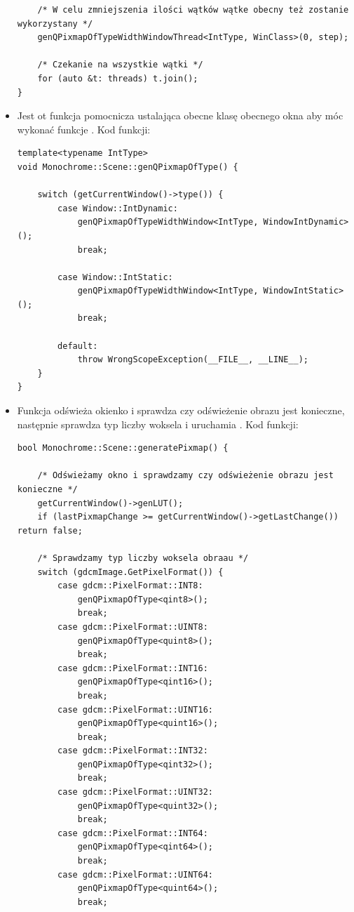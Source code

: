 \begin{itemize}
\begin{lstlisting}
    /* W celu zmniejszenia ilości wątków wątke obecny też zostanie wykorzystany */
    genQPixmapOfTypeWidthWindowThread<IntType, WinClass>(0, step);

    /* Czekanie na wszystkie wątki */
    for (auto &t: threads) t.join();
}
\end{lstlisting}

    \item {}

          Jest ot funkcja pomocnicza ustalająca obecne klasę obecnego okna aby móc wykonać funkcje .
          Kod funkcji:
          \begin{lstlisting}
template<typename IntType>
void Monochrome::Scene::genQPixmapOfType() {

    switch (getCurrentWindow()->type()) {
        case Window::IntDynamic:
            genQPixmapOfTypeWidthWindow<IntType, WindowIntDynamic>();
            break;

        case Window::IntStatic:
            genQPixmapOfTypeWidthWindow<IntType, WindowIntStatic>();
            break;

        default:
            throw WrongScopeException(__FILE__, __LINE__);
    }
}
\end{lstlisting}

    \item {}

          Funkcja odświeża okienko i sprawdza czy odświeżenie obrazu jest konieczne, następnie sprawdza typ liczby woksela i uruchamia .
          Kod funkcji:
          \begin{lstlisting}
bool Monochrome::Scene::generatePixmap() {

    /* Odświeżamy okno i sprawdzamy czy odświeżenie obrazu jest konieczne */
    getCurrentWindow()->genLUT();
    if (lastPixmapChange >= getCurrentWindow()->getLastChange()) return false;

    /* Sprawdzamy typ liczby woksela obraau */
    switch (gdcmImage.GetPixelFormat()) {
        case gdcm::PixelFormat::INT8:
            genQPixmapOfType<qint8>();
            break;
        case gdcm::PixelFormat::UINT8:
            genQPixmapOfType<quint8>();
            break;
        case gdcm::PixelFormat::INT16:
            genQPixmapOfType<qint16>();
            break;
        case gdcm::PixelFormat::UINT16:
            genQPixmapOfType<quint16>();
            break;
        case gdcm::PixelFormat::INT32:
            genQPixmapOfType<qint32>();
            break;
        case gdcm::PixelFormat::UINT32:
            genQPixmapOfType<quint32>();
            break;
        case gdcm::PixelFormat::INT64:
            genQPixmapOfType<qint64>();
            break;
        case gdcm::PixelFormat::UINT64:
            genQPixmapOfType<quint64>();
            break;


\end{lstlisting}
\end{itemize}
